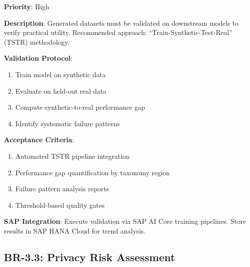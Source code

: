 \documentclass[12pt,a4paper,twoside]{report}
\begin{document}
\begin{tcolorbox}[colback=yellow!5,colframe=yellow!70,title=BR-3.2: Downstream Model Validation]
\textbf{Priority}: High

\textbf{Description}: Generated datasets must be validated on downstream models
to verify practical utility. Recommended approach: ``Train-Synthetic-Test-Real''
(TSTR) methodology.

\textbf{Validation Protocol}:
\begin{enumerate}
\item Train model on synthetic data
\item Evaluate on held-out real data
\item Compute synthetic-to-real performance gap
\item Identify systematic failure patterns
\end{enumerate}

\textbf{Acceptance Criteria}:
\begin{enumerate}
\item Automated TSTR pipeline integration
\item Performance gap quantification by taxonomy region
\item Failure pattern analysis reports
\item Threshold-based quality gates
\end{enumerate}

\textbf{SAP Integration}: Execute validation via SAP AI Core training pipelines.
Store results in SAP HANA Cloud for trend analysis.
\end{tcolorbox}

\subsection{BR-3.3: Privacy Risk Assessment}
\end{document}
